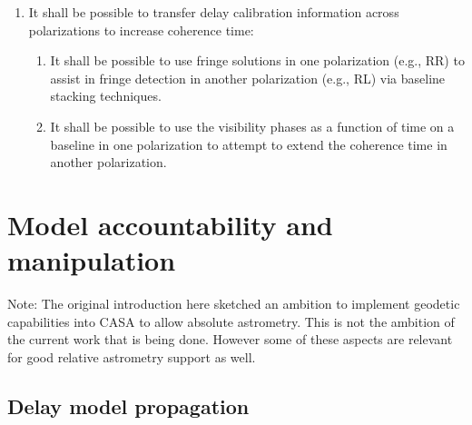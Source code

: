 \documentclass[11pt,a4paper]{article}
\begin{document}
\begin{enumerate}[subseclist]

\item It shall be possible to transfer delay calibration information
  across polarizations to increase coherence time:

\begin{enumerate}[subsecsublist]

\item It shall be possible to use fringe solutions in one polarization
  (e.g., RR) to assist in fringe detection in another polarization
  (e.g., RL) via baseline stacking techniques.

\item It shall be possible to use the visibility phases as a function
  of time on a baseline in one polarization to attempt to extend the
  coherence time in another polarization.

\end{enumerate}

\end{enumerate}


\section{Model accountability and manipulation}

Note: The original introduction here sketched an ambition to implement
geodetic capabilities into CASA to allow absolute astrometry.  This is
not the ambition of the current work that is being done.  However some
of these aspects are relevant for good relative astrometry support as
well.

\subsection{Delay model propagation}
\end{document}
